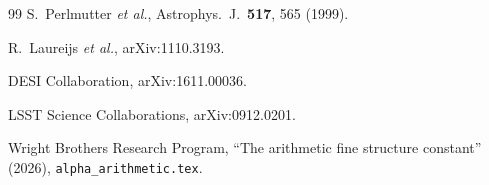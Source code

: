 \documentclass[11pt,a4paper]{article}
\begin{document}
\begin{thebibliography}{99}
S.~Perlmutter \textit{et al.}, Astrophys.\ J.\ \textbf{517}, 565 (1999).

R.~Laureijs \textit{et al.}, arXiv:1110.3193.

DESI Collaboration, arXiv:1611.00036.

LSST Science Collaborations, arXiv:0912.0201.

Wright Brothers Research Program, ``The arithmetic fine structure
constant'' (2026), \texttt{alpha\_arithmetic.tex}.

\end{thebibliography}
\end{document}
